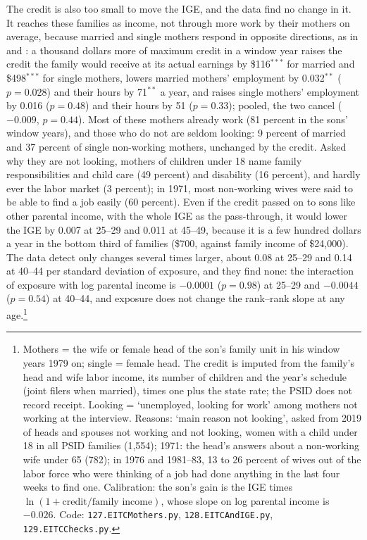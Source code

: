 The credit is also too small to move the IGE, and the data find no change in it. It reaches these families as income,
not through more work by their mothers on average, because married and single mothers respond in opposite directions,
as in \citet{eissa2004taxes} and \citet{eissa1996labor}: a thousand dollars more of maximum credit in a window year
raises the credit the family would receive at its actual earnings by \$116$^{***}$ for married and \$498$^{***}$ for
single mothers, lowers married mothers' employment by 0.032$^{**}$ ($p = 0.028$) and their hours by 71$^{**}$ a year,
and raises single mothers' employment by 0.016 ($p = 0.48$) and their hours by 51 ($p = 0.33$); pooled, the two cancel
($-0.009$, $p = 0.44$). Most of these mothers already work (81 percent in the sons' window years), and those who do not
are seldom looking: 9 percent of married and 37 percent of single non-working mothers, unchanged by the credit. Asked
why they are not looking, mothers of children under 18 name family responsibilities and child care (49 percent) and
disability (16 percent), and hardly ever the labor market (3 percent); in 1971, most non-working wives were said to be
able to find a job easily (60 percent). Even if the credit passed on to sons like other parental income, with the whole
IGE as the pass-through, it would lower the IGE by 0.007 at 25--29 and 0.011 at 45--49, because it is a few hundred
dollars a year in the bottom third of families (\$700, against family income of \$24,000). The data detect only
changes several times larger, about 0.08 at 25--29 and 0.14 at 40--44 per standard deviation of exposure, and they find
none: the interaction of exposure with log parental income is $-0.0001$ ($p = 0.98$) at 25--29 and $-0.0044$
($p = 0.54$) at 40--44, and exposure does not change the rank--rank slope at any age.\footnote{Mothers = the wife or
female head of the son's family unit in his window years 1979 on; single = female head. The credit is imputed from the
family's head and wife labor income, its number of children and the year's schedule (joint filers when married), times
one plus the state rate; the PSID does not record receipt. Looking = `unemployed, looking for work' among mothers not
working at the interview. Reasons: `main reason not looking', asked from 2019 of heads and spouses not working and not
looking, women with a child under 18 in all PSID families (1,554); 1971: the head's answers about a non-working wife
under 65 (782); in 1976 and 1981--83, 13 to 26 percent of wives out of the labor force who were thinking of a job had
done anything in the last four weeks to find one. Calibration: the son's gain is the IGE times
$\ln(1 + \text{credit}/\text{family income})$, whose slope on log parental income is $-0.026$. Code:
\texttt{127.EITCMothers.py}, \texttt{128.EITCAndIGE.py}, \texttt{129.EITCChecks.py}.}


